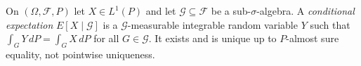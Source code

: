 
On $(\Omega,\mathcal F,P)$ let $X\in L^1(P)$ and let $\mathcal G\subseteq\mathcal F$ be a sub-$\sigma$-algebra. A \emph{conditional expectation} $E[X\mid\mathcal G]$ is a $\mathcal G$-measurable integrable random variable $Y$ such that $\int_GY\,dP=\int_GX\,dP$ for all $G\in\mathcal G$. It exists and is unique up to $P$-almost sure equality, not pointwise uniqueness.
